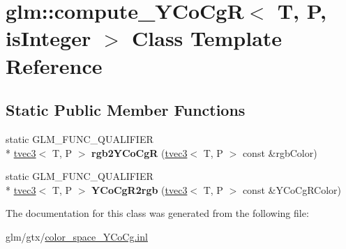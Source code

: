 \hypertarget{classglm_1_1compute__YCoCgR}{\section{glm\-:\-:compute\-\_\-\-Y\-Co\-Cg\-R$<$ T, P, is\-Integer $>$ Class Template Reference}
\label{classglm_1_1compute__YCoCgR}
}
\subsection*{Static Public Member Functions}
\begin{DoxyCompactItemize}
\item 
\hypertarget{classglm_1_1compute__YCoCgR_af5f438f3ec49d12f350e6ed2bb1c896c}{static G\-L\-M\-\_\-\-F\-U\-N\-C\-\_\-\-Q\-U\-A\-L\-I\-F\-I\-E\-R \\*
\hyperlink{structglm_1_1tvec3}{tvec3}$<$ T, P $>$ {\bfseries rgb2\-Y\-Co\-Cg\-R} (\hyperlink{structglm_1_1tvec3}{tvec3}$<$ T, P $>$ const \&rgb\-Color)}\label{classglm_1_1compute__YCoCgR_af5f438f3ec49d12f350e6ed2bb1c896c}

\item 
\hypertarget{classglm_1_1compute__YCoCgR_a08e033fb9983afcffecc1b20de968715}{static G\-L\-M\-\_\-\-F\-U\-N\-C\-\_\-\-Q\-U\-A\-L\-I\-F\-I\-E\-R \\*
\hyperlink{structglm_1_1tvec3}{tvec3}$<$ T, P $>$ {\bfseries Y\-Co\-Cg\-R2rgb} (\hyperlink{structglm_1_1tvec3}{tvec3}$<$ T, P $>$ const \&Y\-Co\-Cg\-R\-Color)}\label{classglm_1_1compute__YCoCgR_a08e033fb9983afcffecc1b20de968715}

\end{DoxyCompactItemize}


The documentation for this class was generated from the following file\-:\begin{DoxyCompactItemize}
\item 
glm/gtx/\hyperlink{color__space__YCoCg_8inl}{color\-\_\-space\-\_\-\-Y\-Co\-Cg.\-inl}\end{DoxyCompactItemize}
